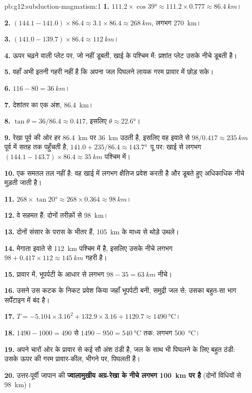 \begin{solution}{pb:g12:subduction-magmatism:1}
\textbf{1.} $111.2 \times \cos\ang{39} \approx 111.2 \times 0.777 \approx
\qty{86.4}{km}$।

\textbf{2.} $(144.1 - 141.0) \times 86.4 \approx 3.1 \times 86.4 \approx
\qty{268}{km}$, लगभग \qty{270}{km}।

\textbf{3.} $(141.0 - 139.7) \times 86.4 \approx \qty{112}{km}$।

\textbf{4.} ऊपर चढ़ने वाली प्लेट पर, जो नहीं डूबती, खाई के
पश्चिम में: प्रशांत प्लेट उसके नीचे डूबती है।

\textbf{5.} वहाँ  अभी इतनी गहरी नहीं है कि अपना जल
पिघलने लायक गरम प्रावार में छोड़ सके।

\textbf{6.} $116 - 80 = \qty{36}{km}$।

\textbf{7.} देशांतर का एक अंश, \qty{86.4}{km}।

\textbf{8.} $\tan\theta = 36/86.4 \approx 0.417$, इसलिए $\theta \approx
\ang{22.6}$।

\textbf{9.} रेखा पूर्व की ओर हर \qty{86.4}{km} पर \qty{36}{km} उठती है, इसलिए वह
इवाते से $98/0.417 \approx \qty{235}{km}$ पूर्व में सतह तक पहुँचती है,
$141.0 + 235/86.4 \approx \ang{143.7}$~पू पर: खाई से लगभग $(144.1 - 143.7) \times 86.4
\approx \qty{35}{km}$ पश्चिम में।

\textbf{10.}  एक समतल तल नहीं है: वह खाई में लगभग
क्षैतिज प्रवेश करती है और डूबते हुए अधिकाधिक नीचे मुड़ती जाती है।

\textbf{11.} $268 \times \tan\ang{20} \approx 268 \times 0.364 \approx
\qty{98}{km}$।

\textbf{12.} वे सहमत हैं: दोनों तरीक़ों से \qty{98}{km}।

\textbf{13.} दोनों संसार के परास के भीतर हैं, \qty{105}{km} के माध्य से
थोड़े उथले।

\textbf{14.} मेगाता इवाते से \qty{112}{km} पश्चिम में है, इसलिए उसके नीचे 
लगभग $98 + 0.417 \times 112 \approx \qty{145}{km}$ गहरी है।

\textbf{15.} प्रावार में, भूपर्पटी के आधार से लगभग $98 - 35 = \qty{63}{km}$
नीचे।

\textbf{16.} उसने उस कटक के निकट प्रवेश किया जहाँ भूपर्पटी बनी, समुद्री
जल से; उसका बहुत-सा भाग सर्पेंटाइन में बंद है।

\textbf{17.} $T = -5.104 \times 3.16^2 + 132.9 \times 3.16 + 1120.7 \approx
\qty{1490}{\celsius}$।

\textbf{18.} $1490 - 1000 = 490$ से $1490 - 950 = \qty{540}{\celsius}$ तक:
लगभग \qty{500}{\celsius}।

\textbf{19.}  अपने चारों ओर के प्रावार से कई सौ अंश ठंडी है, जल के साथ भी
पिघलने के लिए बहुत ठंडी: उसके ऊपर की गरम प्रावार-कील,
भीगने पर, पिघलती है।

\textbf{20.} उत्तर-पूर्वी जापान की \textbf{ज्वालामुखीय अग्र-रेखा के नीचे  लगभग \qty{100}{km}
पर है} (दोनों विधियों से \qty{98}{km})।
\end{solution}
